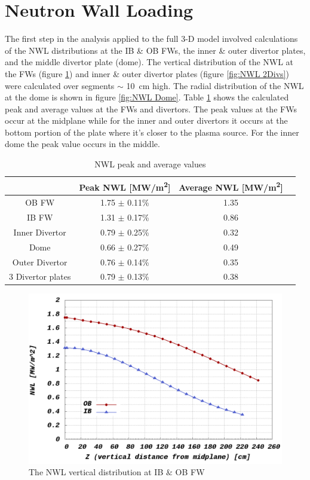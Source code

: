 \documentclass[12pt, letterpaper]{elsarticle}
\begin{document}
\section{Neutron Wall Loading} \label{Neutron Wall Loading}
The first step in the analysis applied to the full 3-D model involved calculations of the NWL distributions at the IB \& OB FWs, the inner \& outer divertor plates, and the middle divertor plate (dome). The vertical distribution of the NWL at the FWs (figure \ref{fig:NWL FWs}) and inner \& outer divertor plates (figure \ref{fig:NWL 2Divs}) were calculated over segments $\sim$ \SI{10}{cm} high. The radial distribution of the NWL at the dome is shown in figure \ref{fig:NWL Dome}. Table \ref{NWL peak and average values} shows the calculated peak and average values at the FWs and divertors. The peak values at the FWs occur at the midplane while for the inner and outer divertors it occurs at the bottom portion of the plate where it's closer to the plasma source. For the inner dome the peak value occurs in the middle.  
\begin{table}[h!]
	\caption{NWL peak and average values}
	\label{NWL peak and average values}
	\begin{tabular}{ |c|c|c|c| } 
		\hline
		 {} & Peak NWL [MW/m\textsuperscript{2}] & Average NWL [MW/m\textsuperscript{2}] \\
		\hline
		{OB FW} & 1.75 $\pm$ 0.11\% & 1.35 \\
		\hline
		{IB FW} & 1.31 $\pm$ 0.17\% & 0.86 \\
		\hline
		{Inner Divertor} & 0.79 $\pm$ 0.25\% & 0.32 \\
		\hline
		{Dome} & 0.66 $\pm$ 0.27\% & 0.49 \\
		\hline
		{Outer Divertor} & 0.76 $\pm$ 0.14\% & 0.35 \\
		\hline
		{3 Divertor plates} & 0.79 $\pm$ 0.13\% & 0.38 \\
		\hline
	\end{tabular}
\end{table}
 \begin{figure}[h!]
  \centering
  \includegraphics[scale=0.2]{../plots/NWL_FWs.png}
  \caption{The NWL vertical distribution at IB $\&$ OB FW}
  \label{fig:NWL FWs}
\end{figure}
\end{document}
